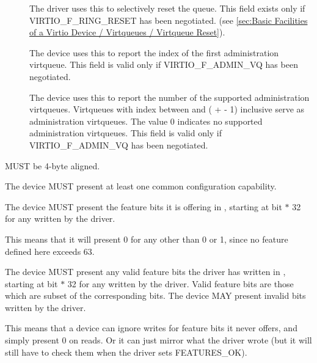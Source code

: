 \begin{description}
\item[]
        The driver uses this to selectively reset the queue.
        This field exists only if VIRTIO_F_RING_RESET has been
        negotiated. (see \ref{sec:Basic Facilities of a Virtio Device / Virtqueues / Virtqueue Reset}).

\item[]
        The device uses this to report the index of the first administration virtqueue.
        This field is valid only if VIRTIO_F_ADMIN_VQ has been negotiated.
\item[]
	The device uses this to report the number of the
	supported administration virtqueues.
	Virtqueues with index
	between  and ( +
	 - 1) inclusive serve as administration
	virtqueues.
	The value 0 indicates no supported administration virtqueues.
	This field is valid only if VIRTIO_F_ADMIN_VQ has been
	negotiated.
\end{description}

 MUST be 4-byte aligned.

The device MUST present at least one common configuration capability.

The device MUST present the feature bits it is offering in , starting at bit  $*$ 32 for any  written by the driver.
\begin{note}
  This means that it will present 0 for any  other than 0 or 1, since no feature defined here exceeds 63.
\end{note}

The device MUST present any valid feature bits the driver has written in , starting at bit  $*$ 32 for any  written by the driver.  Valid feature bits are those which are subset of the corresponding  bits.  The device MAY present invalid bits written by the driver.

\begin{note}
  This means that a device can ignore writes for feature bits it never
  offers, and simply present 0 on reads.  Or it can just mirror what the driver wrote
  (but it will still have to check them when the driver sets FEATURES_OK).
\end{note}

